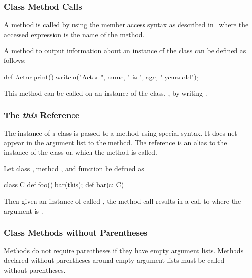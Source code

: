 \subsubsection{Class Method Calls}
\label{Class_Method_Calls}

A method is called by using the member access syntax as described
in~ where the accessed expression is
the name of the method.

\begin{example}
A method to output information about an instance of the 
class can be defined as follows:
\begin{chapel}
def Actor.print() {
  writeln("Actor ", name, " is ", age, " years old");
}
\end{chapel}
This method can be called on an instance of the 
class, , by writing .
\end{example}

\subsubsection{The {\em this} Reference}
\label{The_em_this_Reference}

The instance of a class is passed to a method using special syntax.
It does not appear in the argument list to the method.  The
reference  is an alias to the instance of the class on
which the method is called.

\begin{example}
Let class , method , and function  be
defined as
\begin{chapel}
class C {
  def foo() {
    bar(this);
  }
}
def bar(c: C) { }
\end{chapel}
Then given an instance of  called , the method
call  results in a call to  where the argument
is .
\end{example}

\subsubsection{Class Methods without Parentheses}
\label{Class_Methods_without_Parentheses}

Methods do not require parentheses if they have empty argument lists.
Methods declared without parentheses around empty argument lists must
be called without parentheses.

